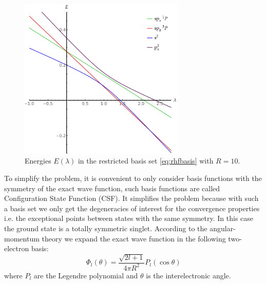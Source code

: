 \documentclass[11pt,a4paper]{article}
\begin{document}
\begin{figure}[h!]
    \centering
    \includegraphics[width=0.7\textwidth]{EMP_RHF_R10.pdf}
    \caption{\centering Energies $E(\lambda)$ in the restricted basis set \eqref{eq:rhfbasis} with $R=10$.}
    \label{fig:RHFMiniBas}
\end{figure}

To simplify the problem, it is convenient to only consider basis functions with the symmetry of the exact wave function, such basis functions are called Configuration State Function (CSF). It simplifies the problem because with such a basis set we only get the degeneracies of interest for the convergence properties i.e. the exceptional points between states with the same symmetry. In this case the ground state is a totally symmetric singlet. According to the angular-momentum theory \cite{AngularBook, SlaterBook, Loos_2009} we expand the exact wave function in the following two-electron basis:
\begin{equation}
\Phi_l(\theta)=\frac{\sqrt{2l+1}}{4\pi R^2}P_l(\cos\theta)
\end{equation}
where $P_l$ are the Legendre polynomial and $\theta$ is the interelectronic angle.
\end{document}
